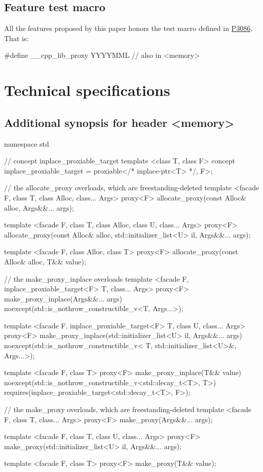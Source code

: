 \documentclass[10pt, a4paper, oneside]{article}
\begin{document}
\subsection{Feature test macro}
All the features proposed by this paper honors the test macro defined in \href{https://wg21.link/p3086}{P3086}.
That is:
\begin{codeblock}
#define __cpp_lib_proxy YYYYMML // also in \textless memory\textgreater
\end{codeblock}

\section{Technical specifications}
\subsection{Additional synopsis for header \textless memory\textgreater}

\begin{codeblock}
namespace std {
  // concept inplace\_proxiable\_target
  template <class T, class F>
  concept inplace_proxiable_target = proxiable</* inplace-ptr<T> */, F>;

  // the allocate\_proxy overloads, which are freestanding-deleted
  template <facade F, class T, class Alloc, class... Args>
  proxy<F> allocate_proxy(const Alloc& alloc, Args&&... args);

  template <facade F, class T, class Alloc, class U, class... Args>
  proxy<F> allocate_proxy(const Alloc& alloc, std::initializer_list<U> il, Args&&... args);

  template <facade F, class Alloc, class T>
  proxy<F> allocate_proxy(const Alloc& alloc, T&& value);

  // the make\_proxy\_inplace overloads
  template <facade F, inplace_proxiable_target<F> T, class... Args>
  proxy<F> make_proxy_inplace(Args&&... args)
      noexcept(std::is_nothrow_constructible_v<T, Args...>);

  template <facade F, inplace_proxiable_target<F> T, class U, class... Args>
  proxy<F> make_proxy_inplace(std::initializer_list<U> il, Args&&... args)
      noexcept(std::is_nothrow_constructible_v<
          T, std::initializer_list<U>&, Args...>);

  template <facade F, class T>
  proxy<F> make_proxy_inplace(T&& value)
      noexcept(std::is_nothrow_constructible_v<std::decay_t<T>, T>)
      requires(inplace_proxiable_target<std::decay_t<T>, F>);

  // the make\_proxy overloads, which are freestanding-deleted
  template <facade F, class T, class... Args>
  proxy<F> make_proxy(Args&&... args);
  
  template <facade F, class T, class U, class... Args>
  proxy<F> make_proxy(std::initializer_list<U> il, Args&&... args);
  
  template <facade F, class T>
  proxy<F> make_proxy(T&& value);
}
\end{codeblock}
\end{document}
